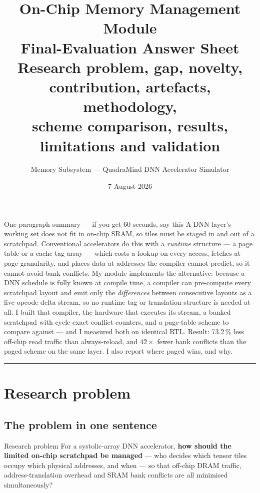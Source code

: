 \documentclass[11pt,a4paper]{article}
\title{\vspace{-1.7cm}
  \textcolor{stampblue}{\Large\bfseries On-Chip Memory Management Module}\\[0.35em]
  \large Final-Evaluation Answer Sheet\\[0.2em]
  \normalsize Research problem, gap, novelty, contribution, artefacts,
  methodology,\\ scheme comparison, results, limitations and validation}
\author{\small Memory Subsystem --- QuadraMind DNN Accelerator Simulator}
\date{\small 7 August 2026}
\begin{document}
\maketitle
\thispagestyle{fancy}

\begin{keybox}{One-paragraph summary --- if you get 60 seconds, say this}
A DNN layer's working set does not fit in on-chip SRAM, so tiles must be
staged in and out of a scratchpad. Conventional accelerators do this with a
\emph{runtime} structure --- a page table or a cache tag array --- which costs
a lookup on every access, fetches at page granularity, and places data at
addresses the compiler cannot predict, so it cannot avoid bank conflicts. My
module implements the alternative: because a DNN schedule is fully known at
compile time, a compiler can pre-compute every scratchpad layout and emit only
the \emph{differences} between consecutive layouts as a five-opcode delta
stream, so no runtime tag or translation structure is needed at all. I built
that compiler, the hardware that executes its stream, a banked scratchpad with
cycle-exact conflict counters, and a page-table scheme to compare against ---
and I measured both on identical RTL. Result: 73.2\,\% less off-chip read
traffic than always-reload, and $42\times$ fewer bank conflicts than the paged
scheme on the same layer. I also report where paged wins, and why.
\end{keybox}

\tableofcontents
\vspace{0.4em}
\hrule

\section{Research problem}

\subsection{The problem in one sentence}

\begin{keybox}{Research problem}
For a systolic-array DNN accelerator, \textbf{how should the limited on-chip
scratchpad be managed} --- who decides which tensor tiles occupy which physical
addresses, and when --- so that off-chip DRAM traffic, address-translation
overhead and SRAM bank conflicts are all minimised simultaneously?
\end{keybox}
\end{document}
